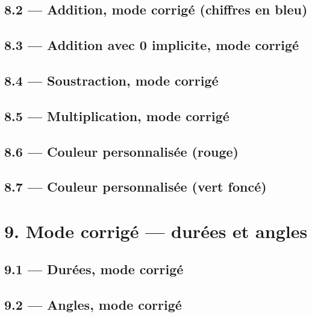 \documentclass[12pt]{extarticle}
\begin{document}
\subsection*{8.2 — Addition, mode corrigé (chiffres en bleu)}

\subsection*{8.3 — Addition avec 0 implicite, mode corrigé}

\subsection*{8.4 — Soustraction, mode corrigé}

\subsection*{8.5 — Multiplication, mode corrigé}

\subsection*{8.6 — Couleur personnalisée (rouge)}

\subsection*{8.7 — Couleur personnalisée (vert foncé)}

\section*{9. Mode corrigé — durées et angles}

\subsection*{9.1 — Durées, mode corrigé}

\subsection*{9.2 — Angles, mode corrigé}
\end{document}
